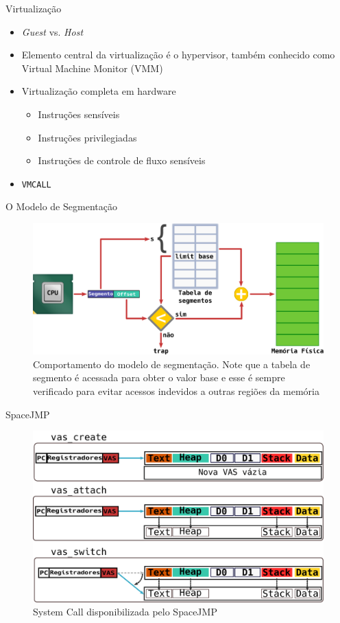 \documentclass[xcolor={usenames,svgnames,dvipsnames},brazil,english,12pt,aspectratio=149]{beamer}
\begin{document}
\begin{frame}{Virtualização}
    \begin{itemize}
      \item \emph{Guest} vs. \emph{Host}
      \item Elemento central da virtualização é o hypervisor, também conhecido
            como Virtual Machine Monitor (VMM)
      \item Virtualização completa em hardware
          \begin{itemize}
          \item Instruções sensíveis
          \item Instruções privilegiadas
          \item Instruções de controle de fluxo sensíveis
      \end{itemize}
      \item \texttt{VMCALL}
    \end{itemize}
\end{frame}

\begin{frame}{O Modelo de Segmentação}
  \begin{figure}[!h]
    \centering
    \includegraphics[width=.80\textwidth]{segmentacao} 
    \caption*{Comportamento do modelo de segmentação. Note que a tabela de segmento é acessada para obter o valor base e esse é sempre verificado para evitar acessos indevidos a outras regiões da memória}
  \end{figure}
\end{frame}

\begin{frame}{SpaceJMP}
  \begin{figure}[!h]
    \centering
    \includegraphics[width=.7\textwidth]{mvas_example} 
    \caption*{System Call disponibilizada pelo SpaceJMP}
  \end{figure}
\end{frame}
\end{document}
